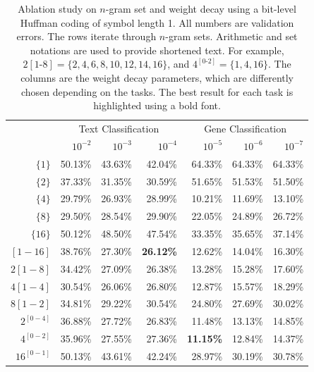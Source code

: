 \documentclass{article}
\begin{document}
\begin{table}[t]
  \caption{Ablation study on \(n\)-gram set and weight decay using a bit-level Huffman coding of symbol length 1. All numbers are validation errors. The rows iterate through \(n\)-gram sets. Arithmetic and set notations are used to provide shortened text. For example, \(2[1\text{-}8] = \{2,4,6,8,10,12,14,16\}\), and \(4^{[0\text{-}2]}=\{1,4,16\}\). The columns are the weight decay parameters, which are differently chosen depending on the tasks. The best result for each task is highlighted using a bold font.}
  \label{tab:huffman-gram}
  \begin{center}
    \begin{tabular}{r|rrr|rrr}
      \hline
      & \multicolumn{3}{|c}{Text Classification}  & \multicolumn{3}{|c}{Gene Classification} \\
      & \(10^{-2}\) & \(10^{-3}\) & \(10^{-4}\) & \(10^{-5}\) & \(10^{-6}\) & \(10^{-7}\) \\ \hline
      \(\{1\}\) & 50.13\% & 43.63\% & 42.04\% & 64.33\% & 64.33\% & 64.33\% \\
      \(\{2\}\) & 37.33\% & 31.35\% & 30.59\% & 51.65\% & 51.53\% & 51.50\% \\
      \(\{4\}\) & 29.79\% & 26.93\% & 28.99\% & 10.21\% & 11.69\% & 13.10\% \\
      \(\{8\}\) & 29.50\% & 28.54\% & 29.90\% & 22.05\% & 24.89\% & 26.72\% \\
      \(\{16\}\) & 50.12\% & 48.50\% & 47.54\% & 33.35\% & 35.65\% & 37.14\% \\
      \([1-16]\) & 38.76\% & 27.30\% & \textbf{26.12\%} & 12.62\% & 14.04\% & 16.30\% \\
      \(2[1-8]\) & 34.42\% & 27.09\% & 26.38\% & 13.28\% & 15.28\% & 17.60\% \\
      \(4[1-4]\) & 30.54\% & 26.06\% & 26.80\% & 12.87\% & 15.57\% & 18.29\% \\
      \(8[1-2]\) & 34.81\% & 29.22\% & 30.54\% & 24.80\% & 27.69\% & 30.02\% \\
      \(2^{[0-4]}\) & 36.88\% & 27.72\% & 26.83\% & 11.48\% & 13.13\% & 14.85\% \\
      \(4^{[0-2]}\) & 35.96\% & 27.55\% & 27.36\% & \textbf{11.15\%} & 12.84\% & 14.37\% \\
      \(16^{[0-1]}\) & 50.13\% & 43.61\% & 42.24\% & 28.97\% & 30.19\% & 30.78\% \\
    \hline
    \end{tabular}
  \end{center}
\end{table}
\end{document}
